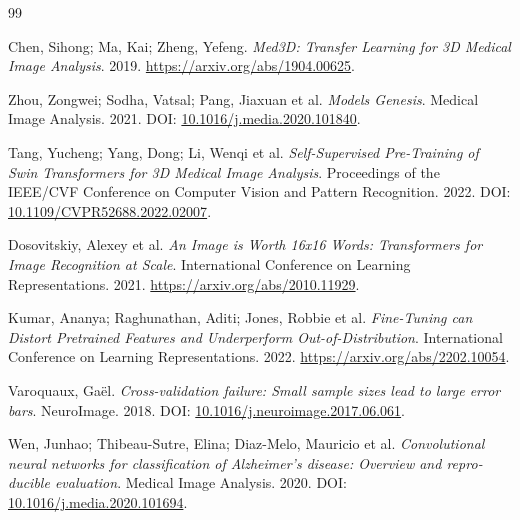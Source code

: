 \begin{thebibliography}{99}
\begin{otherlanguage}{english}
\end{otherlanguage}
\begin{otherlanguage}{english}
Chen, Sihong; Ma, Kai; Zheng, Yefeng. \textit{{Med3D: Transfer Learning for 3D Medical Image Analysis}}. 2019. \url{https://arxiv.org/abs/1904.00625}.
\end{otherlanguage}
\begin{otherlanguage}{english}
Zhou, Zongwei; Sodha, Vatsal; Pang, Jiaxuan et al. \textit{{Models Genesis}}. Medical Image Analysis. 2021. DOI: \url{10.1016/j.media.2020.101840}.
\end{otherlanguage}
\begin{otherlanguage}{english}
Tang, Yucheng; Yang, Dong; Li, Wenqi et al. \textit{{Self-Supervised Pre-Training of Swin Transformers for 3D Medical Image Analysis}}. Proceedings of the IEEE/CVF Conference on Computer Vision and Pattern Recognition. 2022. DOI: \url{10.1109/CVPR52688.2022.02007}.
\end{otherlanguage}
\begin{otherlanguage}{english}
Dosovitskiy, Alexey et al. \textit{{An Image is Worth 16x16 Words: Transformers for Image Recognition at Scale}}. International Conference on Learning Representations. 2021. \url{https://arxiv.org/abs/2010.11929}.
\end{otherlanguage}
\begin{otherlanguage}{english}
Kumar, Ananya; Raghunathan, Aditi; Jones, Robbie et al. \textit{{Fine-Tuning can Distort Pretrained Features and Underperform Out-of-Distribution}}. International Conference on Learning Representations. 2022. \url{https://arxiv.org/abs/2202.10054}.
\end{otherlanguage}
\begin{otherlanguage}{english}
Varoquaux, Ga\"{e}l. \textit{{Cross-validation failure: Small sample sizes lead to large error bars}}. NeuroImage. 2018. DOI: \url{10.1016/j.neuroimage.2017.06.061}.
\end{otherlanguage}
\begin{otherlanguage}{english}
Wen, Junhao; Thibeau-Sutre, Elina; Diaz-Melo, Mauricio et al. \textit{{Convolutional neural networks for classification of Alzheimer's disease: Overview and reproducible evaluation}}. Medical Image Analysis. 2020. DOI: \url{10.1016/j.media.2020.101694}.
\end{otherlanguage}
\begin{otherlanguage}{english}

\end{otherlanguage}
\end{thebibliography}
